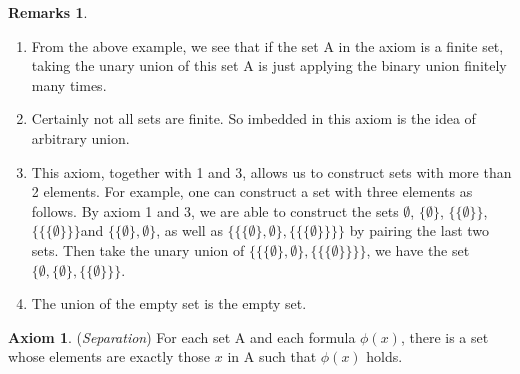 \documentclass[14pt]{article}
\theoremstyle{definition}
\newtheorem*{remark}{Remarks}
\newtheorem{axiom}[definition]{Axiom}
\begin{document}
\begin{remark}
    \hfill
    \begin{enumerate}
        \item From the above example, we see that if the set A in the axiom is a finite set, taking the unary union of this set A is just applying the binary union finitely many times.
        \item Certainly not all sets are finite. So imbedded in this axiom is the idea of arbitrary union.
        \item This axiom, together with 1 and 3, allows us to construct sets with more than 2 elements. For example, one can construct a set with three elements as follows. By axiom 1 and 3, we are able to construct the sets $\emptyset$, $\{\emptyset\}$, $\big\{ \{\emptyset\}\big\}$, $\Big\{\big\{ \{\emptyset\}\big\}\Big\}$and $\big\{\{\emptyset\}, \emptyset\big\}$, as well as $\bigg\{\big\{\{\emptyset\}, \emptyset\big\}, \Big\{\big\{ \{\emptyset\}\big\}\Big\}\bigg\}$ by pairing the last two sets.  Then take the unary union of $\bigg\{\big\{\{\emptyset\}, \emptyset\big\}, \Big\{\big\{ \{\emptyset\}\big\}\Big\}\bigg\}$, we have the set $\Big\{\emptyset, \{\emptyset\},\big\{ \{\emptyset\}\big\}\Big\}$.
        \item The union of the empty set is the empty set.
    \end{enumerate}
\end{remark}

\vspace{3mm}

\begin{axiom}
    (\textit{Separation}) For each set A and each formula $\phi(x)$, there is a set whose elements are exactly those $x$ in A such that $\phi(x)$ holds. 
\end{axiom}
\end{document}
